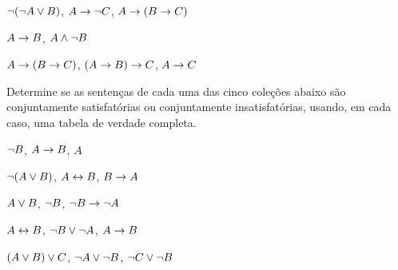 \begin{earg}
\item $\neg(\neg A \vee B) $, $A \rightarrow \neg C$, $A \rightarrow (B \rightarrow C)$\vspace{.5ex} %

% 
%


\item $A \rightarrow B$, $A \wedge \neg B$\vspace{.5ex} %

\item $A \rightarrow (B \rightarrow C)$, $(A \rightarrow B) \rightarrow C$, $A \rightarrow C$\vspace{.5ex} %

\end{earg}

\noindent\problempart
\label{pr.TT.satisfiable3}
Determine se as sentenças de cada uma das cinco coleções abaixo são conjuntamente satisfatórias ou conjuntamente insatisfatórias, usando, em cada caso, uma tabela de verdade completa.
\begin{earg}
\item $\neg B$, $A \rightarrow B$, $A$ \vspace{.5ex}%
\item $\neg(A \vee B)$, $A \leftrightarrow B$, $B \rightarrow A$\vspace{.5ex} %
\item $A \vee B$, $\neg B$, $\neg B \rightarrow \neg A$\vspace{.5ex} %
\item $A \leftrightarrow B$, $\neg B \vee \neg A$, $A \rightarrow B$\vspace{.5ex} %
\item $(A \vee B) \vee C$, $\neg A \vee \neg B$, $\neg C \vee \neg B$\vspace{.5ex} %
\end{earg}




